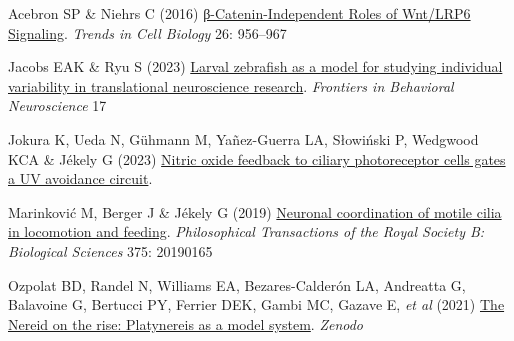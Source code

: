 \documentclass[
  11pt,
]{article}
\newlength{\cslhangindent}
\newenvironment{CSLReferences}[2] %
 {\begin{list}{}{%
  \setlength{\itemindent}{0pt}
  \setlength{\leftmargin}{0pt}
  \setlength{\parsep}{0pt}
  \ifodd #1
   \setlength{\leftmargin}{\cslhangindent}
   \setlength{\itemindent}{-1\cslhangindent}
  \fi
  \setlength{\itemsep}{#2\baselineskip}}}
 {\end{list}}
\begin{document}
\label{refs}
\begin{CSLReferences}{1}{1}
Acebron SP \& Niehrs C (2016)
\href{https://doi.org/10.1016/j.tcb.2016.07.009}{β-Catenin-Independent
Roles of Wnt/LRP6 Signaling}. \emph{Trends in Cell Biology} 26: 956--967

Jacobs EAK \& Ryu S (2023)
\href{https://doi.org/10.3389/fnbeh.2023.1143391}{Larval zebrafish as a
model for studying individual variability in translational neuroscience
research}. \emph{Frontiers in Behavioral Neuroscience} 17

Jokura K, Ueda N, Gühmann M, Yañez-Guerra LA, Słowiński P, Wedgwood KCA
\& Jékely G (2023) \href{https://doi.org/10.7554/elife.91258.1}{Nitric
oxide feedback to ciliary photoreceptor cells gates a UV avoidance
circuit}.

Marinković M, Berger J \& Jékely G (2019)
\href{https://doi.org/10.1098/rstb.2019.0165}{Neuronal coordination of
motile cilia in locomotion and feeding}. \emph{Philosophical
Transactions of the Royal Society B: Biological Sciences} 375: 20190165

Ozpolat BD, Randel N, Williams EA, Bezares-Calderón LA, Andreatta G,
Balavoine G, Bertucci PY, Ferrier DEK, Gambi MC, Gazave E, \emph{et al}
(2021) \href{https://doi.org/10.5281/ZENODO.4907400}{The Nereid on the
rise: Platynereis as a model system}. \emph{Zenodo}

\end{CSLReferences}
\end{document}
